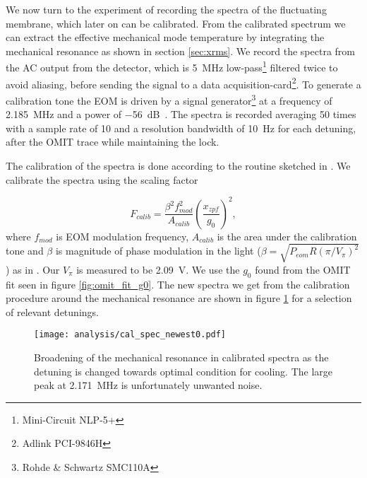 We now turn to the experiment of recording the spectra of the fluctuating membrane, which later on can be calibrated. From the calibrated spectrum we can extract the effective mechanical mode temperature by integrating the mechanical resonance as shown in section \ref{sec:xrms}. We record the spectra from the AC output from the detector, which is \SI{5}{\mega\hertz} low-pass\footnote{Mini-Circuit NLP-5+} filtered twice to avoid aliasing, before sending the signal to a data acquisition-card\footnote{Adlink PCI-9846H}. To generate a calibration tone the EOM is driven by a signal generator\footnote{Rohde \& Schwartz SMC110A} at a frequency of \SI{2.185}{\mega\hertz} and a power of \SI{-56}{\deci\bel\milli}. The spectra is recorded averaging 50 times with a sample rate of \SI{10}{\mega} and a resolution bandwidth of \SI{10}{\hertz} for each detuning, after the OMIT trace while maintaining the lock.

The calibration of the spectra is done according to the routine sketched in \cite{gorodetsky2010}. We calibrate the spectra using the scaling factor

\begin{equation}
F_{calib} = \frac{\beta^2f_{mod}^2}{A_{calib}}\left(\frac{x_{zpf}}{g_0}\right)^2,
\end{equation}
\noindent
where $f_{mod}$ is EOM modulation frequency, $A_{calib}$ is the area under the calibration tone and $\beta$ is magnitude of phase modulation in the light ($\beta = \sqrt{P_{eom}R(\pi/V_{\pi})^2}$) as in \cite{black2001}. Our $V_{\pi}$ is measured to be \SI{2.09}{\volt}. We use the $g_0$ found from the OMIT fit seen in figure \ref{fig:omit_fit_g0}. The new spectra we get from the calibration procedure around the mechanical resonance are shown in figure \ref{fig:spec_calib} for a selection of relevant detunings.

\begin{figure}[H]
\centering
\texttt{[image: analysis/cal\_spec\_newest0.pdf]}
\caption{Broadening of the mechanical resonance in calibrated spectra as the detuning is changed towards optimal condition for cooling. The large peak at \SI{2.171}{\mega\hertz} is unfortunately unwanted noise.}
\label{fig:spec_calib}
\end{figure}

